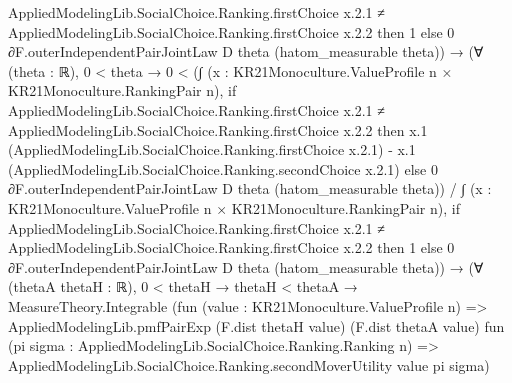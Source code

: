 \documentclass[10pt]{article}
\begin{document}
\begin{ReviewVerbatim}
                                              AppliedModelingLib.SocialChoice.Ranking.firstChoice x.2.1 ≠
                                                AppliedModelingLib.SocialChoice.Ranking.firstChoice x.2.2 then
                                            1
                                          else 0 ∂F.outerIndependentPairJointLaw D theta (hatom_measurable theta)) →
                                  (∀ (theta : ℝ),
                                      0 < theta →
                                        0 <
                                          (∫ (x : KR21Monoculture.ValueProfile n × KR21Monoculture.RankingPair n),
                                              if
                                                  AppliedModelingLib.SocialChoice.Ranking.firstChoice x.2.1 ≠
                                                    AppliedModelingLib.SocialChoice.Ranking.firstChoice x.2.2 then
                                                x.1 (AppliedModelingLib.SocialChoice.Ranking.firstChoice x.2.1) -
                                                  x.1 (AppliedModelingLib.SocialChoice.Ranking.secondChoice x.2.1)
                                              else 0 ∂F.outerIndependentPairJointLaw D theta (hatom_measurable theta)) /
                                            ∫ (x : KR21Monoculture.ValueProfile n × KR21Monoculture.RankingPair n),
                                              if
                                                  AppliedModelingLib.SocialChoice.Ranking.firstChoice x.2.1 ≠
                                                    AppliedModelingLib.SocialChoice.Ranking.firstChoice x.2.2 then
                                                1
                                              else 0 ∂F.outerIndependentPairJointLaw D theta (hatom_measurable theta)) →
                                    (∀ (thetaA thetaH : ℝ),
                                        0 < thetaH →
                                          thetaH < thetaA →
                                            MeasureTheory.Integrable
                                              (fun (value : KR21Monoculture.ValueProfile n) =>
                                                AppliedModelingLib.pmfPairExp (F.dist thetaH value)
                                                  (F.dist thetaA value)
                                                  fun (pi sigma : AppliedModelingLib.SocialChoice.Ranking.Ranking n) =>
                                                  AppliedModelingLib.SocialChoice.Ranking.secondMoverUtility value pi
                                                    sigma)

\end{ReviewVerbatim}
\end{document}
